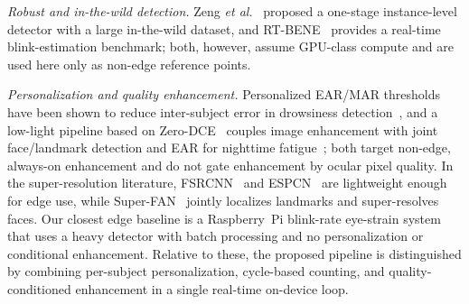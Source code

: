 \documentclass{IEEE_lsens}
\begin{document}
\emph{Robust and in-the-wild detection.} Zeng \textit{et al.}~\cite{zeng2023}
proposed a one-stage instance-level detector with a large in-the-wild dataset,
and RT-BENE~\cite{cortacero2019} provides a real-time blink-estimation
benchmark; both, however, assume GPU-class compute and are used here only as
non-edge reference points.

\emph{Personalization and quality enhancement.} Personalized EAR/MAR thresholds
have been shown to reduce inter-subject error in drowsiness
detection~\cite{drowsy2025}, and a low-light pipeline based on
Zero-DCE~\cite{guo2020} couples image enhancement with joint face/landmark
detection and EAR for nighttime fatigue~\cite{lowlight2025}; both target
non-edge, always-on enhancement and do not gate enhancement by ocular pixel
quality. In the super-resolution literature, FSRCNN~\cite{dong2016} and
ESPCN~\cite{shi2016} are lightweight enough for edge use, while
Super-FAN~\cite{bulat2018} jointly localizes landmarks and super-resolves faces. Our closest edge
baseline is a Raspberry~Pi blink-rate eye-strain system~\cite{carcellar2024}
that uses a heavy detector with batch processing and no personalization or
conditional enhancement. Relative to these, the proposed pipeline is
distinguished by combining per-subject personalization, cycle-based counting,
and quality-conditioned enhancement in a single real-time on-device loop.
\end{document}
